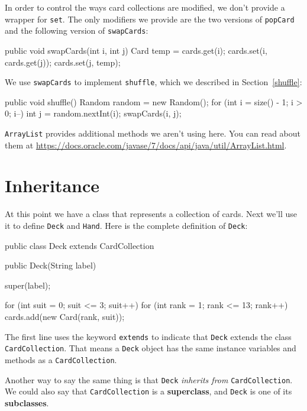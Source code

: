 \documentclass[12pt]{book}
\theoremstyle{exercise}
\newcommand{\java}[1]{\verb"#1"}
\begin{document}
In order to control the ways card collections are modified, we don't provide a wrapper for \java{set}.
The only modifiers we provide are the two versions of \java{popCard} and the following version of \java{swapCards}:

\begin{code}
    public void swapCards(int i, int j) {
        Card temp = cards.get(i);
        cards.set(i, cards.get(j));
        cards.set(j, temp);
    }
\end{code}

We use \java{swapCards} to implement \java{shuffle}, which we described in Section~\ref{shuffle}:

\begin{code}
    public void shuffle() {
        Random random = new Random();
        for (int i = size() - 1; i > 0; i--) {
            int j = random.nextInt(i);
            swapCards(i, j);
        }
    }
\end{code}

\java{ArrayList} provides additional methods we aren't using here.
You can read about them at \url{https://docs.oracle.com/javase/7/docs/api/java/util/ArrayList.html}.


\section{Inheritance}

At this point we have a class that represents a collection of cards.
Next we'll use it to define \java{Deck} and \java{Hand}.
Here is the complete definition of \java{Deck}:

\begin{code}
public class Deck extends CardCollection {

    public Deck(String label) {
        super(label);

        for (int suit = 0; suit <= 3; suit++) {
            for (int rank = 1; rank <= 13; rank++) {
                cards.add(new Card(rank, suit));
            }
        }
    }
}
\end{code}

The first line uses the keyword \java{extends} to indicate that \java{Deck} extends the class \java{CardCollection}.
That means a \java{Deck} object has the same instance variables and methods as a \java{CardCollection}.

Another way to say the same thing is that \java{Deck} {\em inherits from} \java{CardCollection}.
We could also say that \java{CardCollection} is a {\bf superclass}, and \java{Deck} is one of its {\bf subclasses}.
\end{document}
